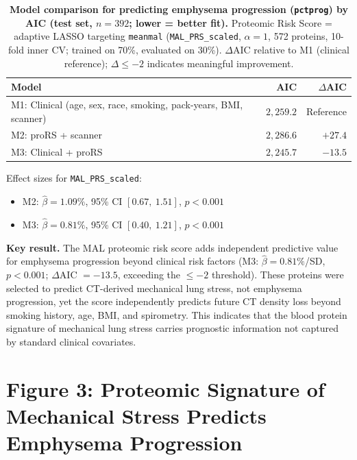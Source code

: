 \documentclass[11pt, letterpaper]{article}
\begin{document}
\begin{table}[H]
\centering
\caption*{\textbf{Model comparison for predicting emphysema progression
  (\texttt{pctprog}) by AIC (test set, $n = 392$; lower = better fit).}
  Proteomic Risk Score = adaptive LASSO targeting \texttt{meanmal}
  (\texttt{MAL\_PRS\_scaled}, $\alpha = 1$, 572 proteins,
  10-fold inner CV; trained on 70\%, evaluated on 30\%).
  $\Delta$AIC relative to M1 (clinical reference);
  $\Delta \leq -2$ indicates meaningful improvement.}
\begin{tabular}{lrr}
\toprule
Model & AIC & $\Delta$AIC \\
\midrule
M1: Clinical (age, sex, race, smoking, pack-years, BMI, scanner) & $2{,}259.2$ & Reference \\
M2: proRS + scanner                                               & $2{,}286.6$ & $+27.4$ \\
M3: Clinical + proRS                                              & $2{,}245.7$ & $-13.5$ \\
\bottomrule
\end{tabular}
\end{table}

\noindent Effect sizes for \texttt{MAL\_PRS\_scaled}:
\begin{itemize}
  \item M2: $\hat\beta = 1.09\%$, 95\% CI $[0.67,\ 1.51]$, $p < 0.001$
  \item M3: $\hat\beta = 0.81\%$, 95\% CI $[0.40,\ 1.21]$, $p < 0.001$
\end{itemize}

\textbf{Key result.} The MAL proteomic risk score adds independent predictive
value for emphysema progression beyond clinical risk factors (M3: $\hat\beta
= 0.81\%$/SD, $p < 0.001$; $\Delta$AIC $= -13.5$, exceeding the $\leq -2$
threshold). These proteins were selected to predict CT-derived mechanical
lung stress, not emphysema progression, yet the score independently predicts
future CT density loss beyond smoking history, age, BMI, and spirometry.
This indicates that the blood protein signature of mechanical lung stress
carries prognostic information not captured by standard clinical covariates.

\section*{Figure 3: Proteomic Signature of Mechanical Stress Predicts Emphysema Progression}
\end{document}
